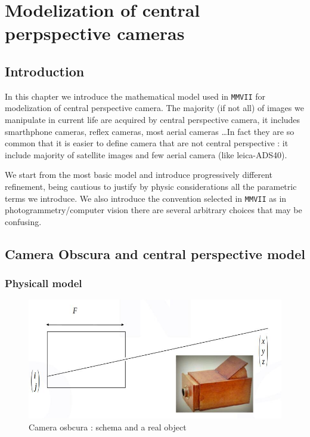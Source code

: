 \chapter{Modelization of central perpspective cameras}



\section{Introduction}

In this chapter we introduce the mathematical model used in {\tt MMVII}
for modelization of central perspective camera.  The majority (if not all)
of images we manipulate in current life are acquired by central perspective camera, it includes
smarthphone cameras,  reflex cameras,  most aerial cameras \dots  In fact they are so common that
it is easier to define camera that are not central  perspective :
it include majority of satellite images and few aerial camera (like leica-ADS40).

We start from the most basic model and introduce progressively different refinement,
being cautious to justify by physic considerations all the parametric terms we introduce.
We also introduce the convention selected in {\tt MMVII} as in photogrammetry/computer vision
there are several arbitrary choices that may be confusing.


\section{Camera Obscura and  central perspective model}

\subsection{Physicall model}

\begin{figure}
\centering
\includegraphics[width=12cm]{Methods/Images/CameraObscura.jpg}\caption{Camera osbcura : schema and a real object}
	\label{fig:CameraObscura}
\end{figure}


